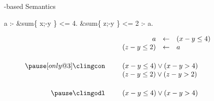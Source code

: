 \begin{frame}[fragile]{\HTC-based Semantics}
  \smallskip
  \begin{semiverbatim}
                            a :- &sum\{ x;-y \} <= 4.
            &sum\{ z;-y \} <= 2 :- a.
  \end{semiverbatim}
  \bigskip\pause
  \[
    \begin{array}{rp{5pt}rclp{20pt}}
                     && a            &\leftarrow&  (x-y\leq 4)         &\\
                     && (z-y\leq 2)  &\leftarrow&  a                   &\\[15pt]\pause[only@3]
    \text{\clingcon} && \multicolumn{3}{l}{(x-y\leq 4) \vee (x-y > 4)} &\\
                     && \multicolumn{3}{l}{(z-y\leq 2) \vee (z-y>2)}   &\\[15pt]\pause
    \text{\clingodl} && \multicolumn{3}{l}{(x-y\leq 4) \vee (x-y > 4)} &
    \end{array}
  \]
\end{frame}
%
